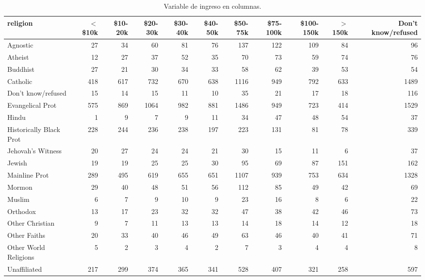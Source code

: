 \documentclass[]{article}
\begin{document}
\begin{table}[ht]
\centering
\begingroup\tiny
\begin{tabular}{lrrrrrrrrrr}
  \hline
religion & $<$\$10k & \$10-20k & \$20-30k & \$30-40k & \$40-50k & \$50-75k & \$75-100k & \$100-150k & $>$150k & Don't know/refused \\ 
  \hline
Agnostic &  27 &  34 &  60 &  81 &  76 & 137 & 122 & 109 &  84 &  96 \\ 
  Atheist &  12 &  27 &  37 &  52 &  35 &  70 &  73 &  59 &  74 &  76 \\ 
  Buddhist &  27 &  21 &  30 &  34 &  33 &  58 &  62 &  39 &  53 &  54 \\ 
  Catholic & 418 & 617 & 732 & 670 & 638 & 1116 & 949 & 792 & 633 & 1489 \\ 
  Don’t know/refused &  15 &  14 &  15 &  11 &  10 &  35 &  21 &  17 &  18 & 116 \\ 
  Evangelical Prot & 575 & 869 & 1064 & 982 & 881 & 1486 & 949 & 723 & 414 & 1529 \\ 
  Hindu &   1 &   9 &   7 &   9 &  11 &  34 &  47 &  48 &  54 &  37 \\ 
  Historically Black Prot & 228 & 244 & 236 & 238 & 197 & 223 & 131 &  81 &  78 & 339 \\ 
  Jehovah's Witness &  20 &  27 &  24 &  24 &  21 &  30 &  15 &  11 &   6 &  37 \\ 
  Jewish &  19 &  19 &  25 &  25 &  30 &  95 &  69 &  87 & 151 & 162 \\ 
  Mainline Prot & 289 & 495 & 619 & 655 & 651 & 1107 & 939 & 753 & 634 & 1328 \\ 
  Mormon &  29 &  40 &  48 &  51 &  56 & 112 &  85 &  49 &  42 &  69 \\ 
  Muslim &   6 &   7 &   9 &  10 &   9 &  23 &  16 &   8 &   6 &  22 \\ 
  Orthodox &  13 &  17 &  23 &  32 &  32 &  47 &  38 &  42 &  46 &  73 \\ 
  Other Christian &   9 &   7 &  11 &  13 &  13 &  14 &  18 &  14 &  12 &  18 \\ 
  Other Faiths &  20 &  33 &  40 &  46 &  49 &  63 &  46 &  40 &  41 &  71 \\ 
  Other World Religions &   5 &   2 &   3 &   4 &   2 &   7 &   3 &   4 &   4 &   8 \\ 
  Unaffiliated & 217 & 299 & 374 & 365 & 341 & 528 & 407 & 321 & 258 & 597 \\ 
   \hline
\end{tabular}
\endgroup
\caption{Variable de ingreso en columnas.} 
\label{tab:varsencols}
\end{table}
\end{document}
